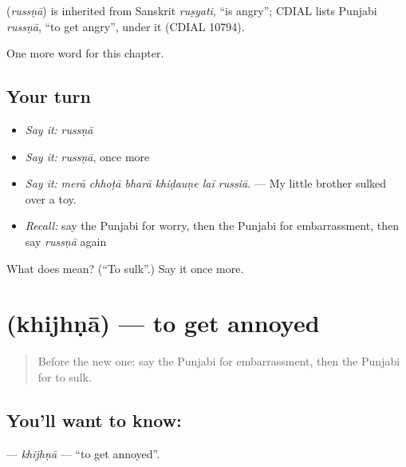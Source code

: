 \begin{cousinweb}
\textbf{} (\emph{russṇā}) is inherited from Sanskrit \emph{ruṣyati}, \textquotedblleft{}is angry\textquotedblright{}; CDIAL lists Punjabi \emph{russṇā}, \textquotedblleft{}to get angry\textquotedblright{}, under it (CDIAL 10794).
\end{cousinweb}

\begin{grammarlens}[title={What you've built}]
One more word for this chapter.
\end{grammarlens}

\subsection*{Your turn}
\begin{itemize}
\raggedright
  \item \emph{Say it:} \emph{russṇā}
  \item \emph{Say it:} \emph{russṇā}, once more
  \item \emph{Say it:} \emph{merā chhoṭā bharā khiḍauṇe laī russiā.} — My little brother sulked over a toy.
  \item \emph{Recall:} say the Punjabi for worry, then the Punjabi for embarrassment, then say \emph{russṇā} again
\end{itemize}

\begin{tcolorbox}[breakable,colback=teal!4,colframe=teal!35!black,title={Before you move on}]
What does  mean? (\textquotedblleft{}To sulk\textquotedblright{}.) Say it once more.
\end{tcolorbox}
\section[\texorpdfstring{\pa{ਖਿਝਣਾ} (khijhṇā)}{ਖਿਝਣਾ (khijhṇā)}]{ (khijhṇā) — to get annoyed}

\label{lesson:PA-C327-khijhna}



\begin{quote}
Before the new one: say the Punjabi for embarrassment, then the Punjabi for to sulk.
\end{quote}

\subsection*{You'll want to know: }
\textbf{} — \emph{khijhṇā} — \textquotedblleft{}to get annoyed\textquotedblright{}.

